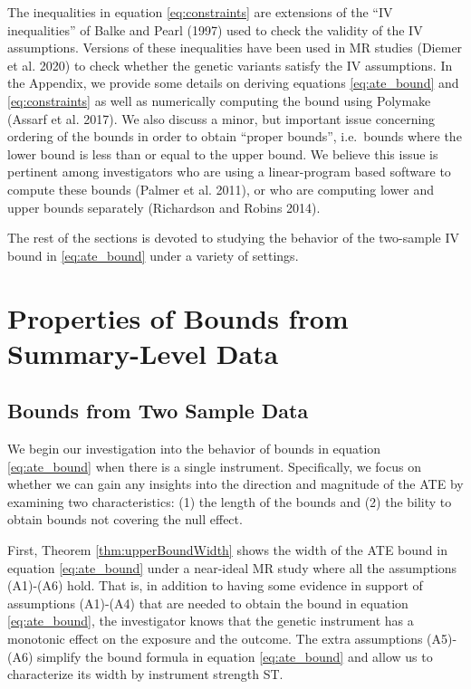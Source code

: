 \documentclass[
]{article}
\theoremstyle{plain}
\begin{document}
The inequalities in equation \eqref{eq:constraints} are extensions of the ``IV inequalities'' of Balke and Pearl (1997) used to check the validity of the IV assumptions. Versions of these inequalities have been used in MR studies (Diemer et al. 2020) to check whether the genetic variants satisfy the IV assumptions. In the Appendix, we provide some details on deriving equations \eqref{eq:ate_bound} and \eqref{eq:constraints} as well as numerically computing the bound using Polymake (Assarf et al. 2017). We also discuss a minor, but important issue concerning ordering of the bounds in order to obtain ``proper bounds'', i.e.~bounds where the lower bound is less than or equal to the upper bound. We believe this issue is pertinent among investigators who are using a linear-program based software to compute these bounds (Palmer et al. 2011), or who are computing lower and upper bounds separately (Richardson and Robins 2014).

The rest of the sections is devoted to studying the behavior of the two-sample IV bound in \eqref{eq:ate_bound} under a variety of settings.

\hypertarget{properties-of-bounds-from-summary-level-data}{%
\section{Properties of Bounds from Summary-Level Data}\label{properties-of-bounds-from-summary-level-data}}

\hypertarget{bounds-from-two-sample-data}{%
\subsection{\texorpdfstring{Bounds from Two Sample Data \label{bounds-from-bivariate-data}}{Bounds from Two Sample Data }}\label{bounds-from-two-sample-data}}

We begin our investigation into the behavior of bounds in equation \eqref{eq:ate_bound} when there is a single instrument. Specifically, we focus on whether we can gain any insights into the direction and magnitude of the ATE by examining two characteristics: (1) the length of the bounds and (2) the bility to obtain bounds not covering the null effect.

First, Theorem \ref{thm:upperBoundWidth} shows the width of the ATE bound in equation \eqref{eq:ate_bound} under a near-ideal MR study where all the assumptions (A1)-(A6) hold. That is, in addition to having some evidence in support of assumptions (A1)-(A4) that are needed to obtain the bound in equation \eqref{eq:ate_bound}, the investigator knows that the genetic instrument has a monotonic effect on the exposure and the outcome. The extra assumptions (A5)-(A6) simplify the bound formula in equation \eqref{eq:ate_bound} and allow us to characterize its width by instrument strength ST.
\end{document}
